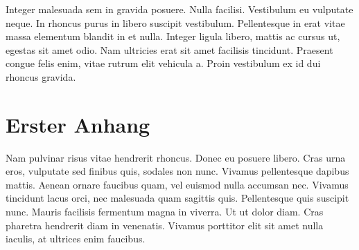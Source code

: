 \documentclass[12pt,a4paper,parskip=half]{scrartcl}
\begin{document}
Integer malesuada sem in gravida posuere. Nulla facilisi. Vestibulum eu vulputate neque. In rhoncus purus in libero suscipit vestibulum. Pellentesque in erat vitae massa elementum blandit in et nulla. Integer ligula libero, mattis ac cursus ut, egestas sit amet odio. Nam ultricies erat sit amet facilisis tincidunt. Praesent congue felis enim, vitae rutrum elit vehicula a. Proin vestibulum ex id dui rhoncus gravida.


\appendix

\section{Erster Anhang}

Nam pulvinar risus vitae hendrerit rhoncus. Donec eu posuere libero. Cras urna eros, vulputate sed finibus quis, sodales non nunc. Vivamus pellentesque dapibus mattis. Aenean ornare faucibus quam, vel euismod nulla accumsan nec. Vivamus tincidunt lacus orci, nec malesuada quam sagittis quis. Pellentesque quis suscipit nunc. Mauris facilisis fermentum magna in viverra. Ut ut dolor diam. Cras pharetra hendrerit diam in venenatis. Vivamus porttitor elit sit amet nulla iaculis, at ultrices enim faucibus.
\end{document}
